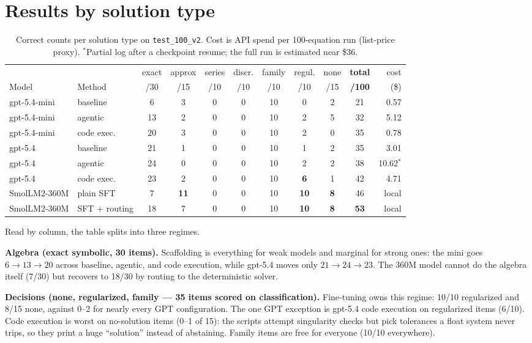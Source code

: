 \documentclass[11pt]{article}
\begin{document}
\section{Results by solution type}

\begin{table}[h]
\centering
\small
\setlength{\tabcolsep}{4.5pt}
\begin{tabular}{llccccccccr}
\toprule
 & & exact & approx & series & discr. & family & regul. & none & \textbf{total} & cost \\
Model & Method & /30 & /15 & /10 & /10 & /10 & /10 & /15 & \textbf{/100} & (\$) \\
\midrule
gpt-5.4-mini & baseline    & 6  & 3  & 0 & 0 & 10 & 0  & 2 & 21 & 0.57 \\
gpt-5.4-mini & agentic     & 13 & 2  & 0 & 0 & 10 & 2  & 5 & 32 & 5.12 \\
gpt-5.4-mini & code exec.  & 20 & 3  & 0 & 0 & 10 & 2  & 0 & 35 & 0.78 \\
\midrule
gpt-5.4 & baseline         & 21 & 1  & 0 & 0 & 10 & 1  & 2 & 35 & 3.01 \\
gpt-5.4 & agentic          & 24 & 0  & 0 & 0 & 10 & 2  & 2 & 38 & 10.62$^{*}$ \\
gpt-5.4 & code exec.       & 23 & 2  & 0 & 0 & 10 & \textbf{6} & 1 & 42 & 4.71 \\
\midrule
SmolLM2-360M & plain SFT   & 7  & \textbf{11} & 0 & 0 & 10 & \textbf{10} & \textbf{8} & 46 & local \\
SmolLM2-360M & SFT + routing & 18 & 7 & 0 & 0 & 10 & \textbf{10} & \textbf{8} & \textbf{53} & local \\
\bottomrule
\end{tabular}
\caption{Correct counts per solution type on \texttt{test\_100\_v2}. Cost is
API spend per 100-equation run (list-price proxy). $^{*}$Partial log after a
checkpoint resume; the full run is estimated near \$36.}
\end{table}

Read by column, the table splits into three regimes.

\textbf{Algebra (exact symbolic, 30 items).} Scaffolding is everything for
weak models and marginal for strong ones: the mini goes $6 \to 13 \to 20$
across baseline, agentic, and code execution, while gpt-5.4 moves only
$21 \to 24 \to 23$. The 360M model cannot do the algebra itself (7/30) but
recovers to 18/30 by routing to the deterministic solver.

\textbf{Decisions (none, regularized, family --- 35 items scored on
classification).} Fine-tuning owns this regime: 10/10 regularized and 8/15
none, against 0--2 for nearly every GPT configuration. The one GPT exception
is gpt-5.4 code execution on regularized items (6/10). Code execution is
worst on no-solution items (0--1 of 15): the scripts attempt singularity
checks but pick tolerances a float system never trips, so they print a huge
``solution'' instead of abstaining. Family items are free for everyone
(10/10 everywhere).
\end{document}
